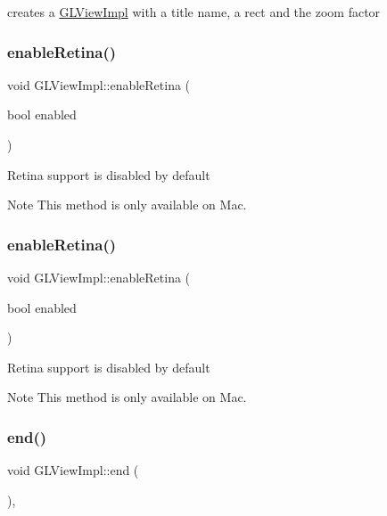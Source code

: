 creates a \hyperlink{classGLViewImpl}{G\+L\+View\+Impl} with a title name, a rect and the zoom factor \mbox{\label{classGLViewImpl_acbad07a997193bc23d8bec639f333040}} 
\subsubsection{\texorpdfstring{enable\+Retina()}{enableRetina()}\hspace{0.1cm}{\footnotesize\ttfamily [1/2]}}
{\footnotesize\ttfamily void G\+L\+View\+Impl\+::enable\+Retina (\begin{DoxyParamCaption}\item[{bool}]{enabled }\end{DoxyParamCaption})}

Retina support is disabled by default \begin{DoxyNote}{Note}
This method is only available on Mac. 
\end{DoxyNote}
\mbox{\label{classGLViewImpl_acbad07a997193bc23d8bec639f333040}} 
\subsubsection{\texorpdfstring{enable\+Retina()}{enableRetina()}\hspace{0.1cm}{\footnotesize\ttfamily [2/2]}}
{\footnotesize\ttfamily void G\+L\+View\+Impl\+::enable\+Retina (\begin{DoxyParamCaption}\item[{bool}]{enabled }\end{DoxyParamCaption})}

Retina support is disabled by default \begin{DoxyNote}{Note}
This method is only available on Mac. 
\end{DoxyNote}
\mbox{\label{classGLViewImpl_ab2d87c9a94b84691ed9ae4ca378745a8}} 
\subsubsection{\texorpdfstring{end()}{end()}\hspace{0.1cm}{\footnotesize\ttfamily [1/9]}}
{\footnotesize\ttfamily void G\+L\+View\+Impl\+::end (\begin{DoxyParamCaption}{ }\end{DoxyParamCaption})\hspace{0.3cm}{\ttfamily [override]}, {\ttfamily [virtual]}}

